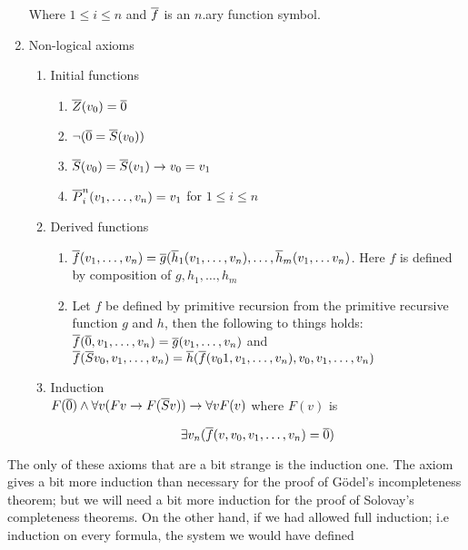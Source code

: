 \documentclass[../main.tex]{subfiles}
\begin{document}
\begin{defi}
\begin{enumerate}
\begin{enumerate}
			\end{enumerate}
			Where $1\leq i\leq n$ and $\overline{f}$ is an $n$.ary
			function symbol.
		\item Non-logical axioms
			\begin{enumerate}
				\item Initial functions
					\begin{enumerate}
						\item $\overline{Z}(v_0)=\overline{0}$
						\item $\neg(\overline{0} =\overline S(v_0))$
						\item $\overline S(v_0)=\overline
							S(v_1)\rightarrow
							v_0=v_1$
						\item $\overline
							P^n_i(v_1,\ldots,v_n)=v_1$
							for $1\leq i\leq n$
					\end{enumerate}
				\item Derived functions
					\begin{enumerate}
						\item $\overline
							f(v_1,\ldots,v_n)=\overline
							g(\overline
							h_1(v_1,\ldots,v_n),\ldots,\overline
							h_m(v_1,\ldots v_n)$.
							Here $f$ is defined by
							composition of
							$g,h_1,\ldots, h_m$
						\item Let $f$ be defined by
							primitive recursion
							from the primitive
							recursive function $g$
							and $h$, then the
							following to things
							holds:\\
							$\overline
							f(\overline{0},v_1,\ldots,v_n)=\overline
							g(v_1,\ldots, v_n)$
							and\\
							$\overline f(\overline
							Sv_0,v_1,\ldots,v_n)=\overline
							h(\overline
							f(v_01,v_1,\ldots,v_n),v_0,v_1,\ldots,v_n)$
					\end{enumerate}
				\item Induction\\
					$F(\overline{0})\wedge\forall v(F
					v\rightarrow F (\overline Sv))\rightarrow
					\forall vF( v)$ where $F( v)$ is

					\[\exists v_n(\overline
					f(v,v_0,v_1,\ldots,v_n)=\overline 0)\]
			\end{enumerate}
	\end{enumerate}
\end{defi}
The only of these axioms that are a bit strange is the induction one. The axiom
gives a bit more induction than necessary for the proof of Gödel's
incompleteness theorem; but we will need a bit more induction for the proof of
Solovay's completeness theorems. On the other hand, if we had allowed full
induction; i.e induction on every formula, the system we would have defined
\end{document}
